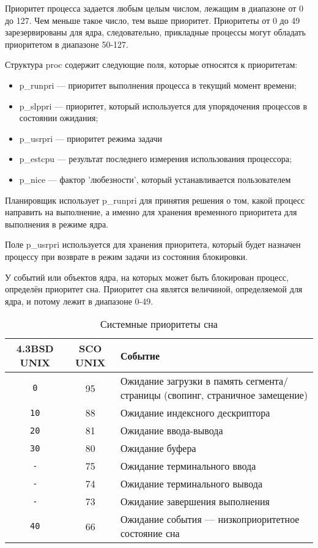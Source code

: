 Приоритет процесса задается любым целым числом, лежащим в диапазоне от 0 до 127. Чем меньше такое число, тем выше приоритет. Приоритеты от 0 до 49 зарезервированы для ядра, следовательно, прикладные процессы могут обладать приоритетом в диапазоне 50-127. 

Структура proc содержит следующие поля, которые относятся к приоритетам:
\begin{itemize}
	\item p\_runpri --- приоритет выполнения процесса в текущий момент времени;
	\item p\_slppri --- приоритет, который используется для упорядочения процессов в состоянии ожидания;
	\item p\_usrpri --- приоритет режима задачи
	\item p\_estcpu --- результат последнего измерения использования процессора;
	\item p\_nice --- фактор 'любезности', который устанавливается пользователем
\end{itemize}

Планировщик использует p\_runpri для принятия решения о том, какой процесс направить на выполнение, а именно для хранения временного приоритета для выполнения в режиме ядра.

Поле p\_usrpri используется для хранения приоритета, который будет назначен процессу при возврате в режим задачи из состояния блокировки. 

У событий или объектов ядра, на которых может быть блокирован процесс, определён приоритет сна. Приоритет сна являтся величиной, определяемой для ядра, и потому лежит в диапазоне 0-49.

\begin{table}[h]
	\caption{Системные приоритеты сна}
	\label{tab:bsd}
	\begin{center}
		\begin{tabular}{ |c|c|p{9cm}|  }
			\hline
			\textbf{4.3BSD UNIX} & \textbf{SCO UNIX} & \textbf{Событие} \\
			\hline
			\texttt{0} & 95 & Ожидание загрузки в память сегмента/страницы (свопинг, страничное замещение) \\
			\hline
			\texttt{10} & 88 & Ожидание индексного дескриптора \\
			\hline
			\texttt{20} & 81 & Ожидание ввода-вывода \\
			\hline
			\texttt{30} & 80 & Ожидание буфера \\
			\hline
			\texttt{-} & 75 & Ожидание терминального ввода \\
			\hline
			\texttt{-} & 74 & Ожидание терминального вывода \\
			\hline
			\texttt{-} & 73 & Ожидание завершения выполнения \\
			\hline
			\texttt{40} & 66 & Ожидание события --- низкоприоритетное состояние сна \\
			\hline
		\end{tabular}
	\end{center}
\end{table}

